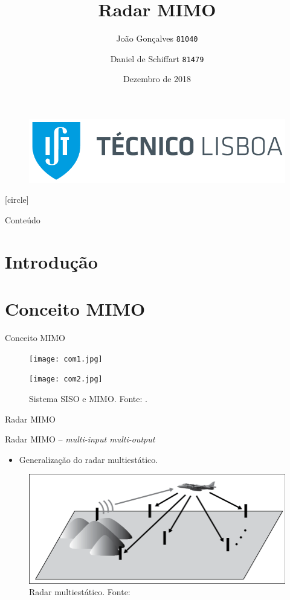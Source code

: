 \documentclass[portuguese]{beamer}
\title[Radar MIMO]{Radar MIMO}
\author[MEAer -- Sistemas de Radar]{
  João Gonçalves \texttt{81040} \and Daniel de Schiffart \texttt{81479} 
    }
\institute{Sistemas de Radar}
\date{Dezembro de 2018}
\begin{document}
\begin{frame}
    \begin{figure}
	\includegraphics[width=0.5\linewidth]{graphics/tecnico_logo.png}
    \end{figure}
    \titlepage
\end{frame}
[circle]
\begin{frame}{Conteúdo}
  \tableofcontents
\end{frame}

\section{Introdução}

\section{Conceito MIMO}

\begin{frame}{Conceito MIMO}
  \begin{figure}[]
	\centering
	\begin{minipage}[t]{0.5\linewidth}
	  \centering
	  \texttt{[image: com1.jpg]}
    \end{minipage}%
    \begin{minipage}[t]{0.5\linewidth}	
	  \centering
	  \texttt{[image: com2.jpg]}
    \end{minipage}%
	\caption{Sistema SISO e MIMO. Fonte: \cite{swantennas}.}
	\label{fig:antenas}
  \end{figure}
\end{frame}

\begin{frame}{Radar MIMO}
  \par
  {\large Radar MIMO -- \textit{multi-input multi-output}} 
  \begin{itemize}
	\item Generalização do radar multiestático.
  \end{itemize}
  \begin{figure}[]
	\centering
	\includegraphics[width=0.8\linewidth]{../report/graphics/multistatic.png}
	\caption{Radar multiestático. Fonte: \cite{mimoradarbook}}
	\label{fig:mono}
  \end{figure}
\end{frame}
\end{document}
